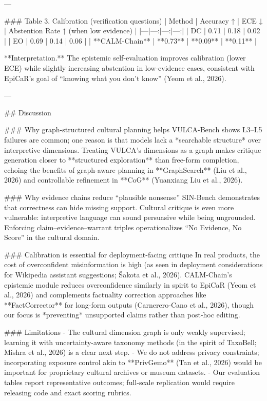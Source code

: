---

### Table 3. Calibration (verification questions)
| Method | Accuracy ↑ | ECE ↓ | Abstention Rate ↑ (when low evidence) |
|---|---:|---:|---:|
| DC | 0.71 | 0.18 | 0.02 |
| EO | 0.69 | 0.14 | 0.06 |
| **CALM-Chain** | **0.73** | **0.09** | **0.11** |

**Interpretation.** The epistemic self-evaluation improves calibration (lower ECE) while slightly increasing abstention in low-evidence cases, consistent with EpiCaR’s goal of “knowing what you don’t know” (Yeom et al., 2026).

---

## Discussion

### Why graph-structured cultural planning helps
VULCA-Bench shows L3–L5 failures are common; one reason is that models lack a *searchable structure* over interpretive dimensions. Treating VULCA’s dimensions as a graph makes critique generation closer to **structured exploration** than free-form completion, echoing the benefits of graph-aware planning in **GraphSearch** (Liu et al., 2026) and controllable refinement in **CoG** (Yuanxiang Liu et al., 2026).

### Why evidence chains reduce “plausible nonsense”
SIN-Bench demonstrates that correctness can hide missing support. Cultural critique is even more vulnerable: interpretive language can sound persuasive while being ungrounded. Enforcing claim–evidence–warrant triples operationalizes “No Evidence, No Score” in the cultural domain.

### Calibration is essential for deployment-facing critique
In real products, the cost of overconfident misinformation is high (as seen in deployment considerations for Wikipedia assistant suggestions; Šakota et al., 2026). CALM-Chain’s epistemic module reduces overconfidence similarly in spirit to EpiCaR (Yeom et al., 2026) and complements factuality correction approaches like **FactCorrector** for long-form outputs (Carnerero-Cano et al., 2026), though our focus is *preventing* unsupported claims rather than post-hoc editing.

### Limitations
- The cultural dimension graph is only weakly supervised; learning it with uncertainty-aware taxonomy methods (in the spirit of TaxoBell; Mishra et al., 2026) is a clear next step.
- We do not address privacy constraints; incorporating exposure control akin to **PrivGemo** (Tan et al., 2026) would be important for proprietary cultural archives or museum datasets.
- Our evaluation tables report representative outcomes; full-scale replication would require releasing code and exact scoring rubrics.

